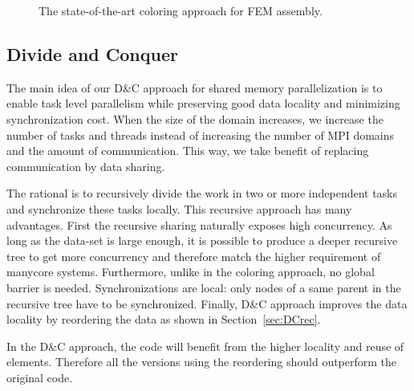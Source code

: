 \documentclass[10pt]{IOS-Book-Article}
\begin{document}
\begin{figure}[htp]
\caption{The state-of-the-art coloring approach for FEM assembly.}
\label{fig:colApp}
\end{figure}

\subsection{Divide and Conquer}
\label{sec:dc}

The main idea of our D\&C approach for shared memory parallelization is to enable task level parallelism while preserving good data locality and minimizing synchronization cost.
When the size of the domain increases, we increase the number of tasks and threads instead of increasing the number of MPI domains and the amount of communication.
This way, we take benefit of replacing communication by data sharing.

The rational is to recursively divide the work in two or more independent tasks and synchronize these tasks locally.
This recursive approach has many advantages.
First the recursive sharing naturally exposes high concurrency.
As long as the data-set is large enough, it is possible to produce a deeper recursive tree to get more concurrency and therefore match the higher requirement of manycore systems.
Furthermore, unlike in the coloring approach, no global barrier is needed.
Synchronizations are local: only nodes of a same parent in the recursive tree have to be synchronized.
Finally, D\&C approach improves the data locality by reordering the data as shown in Section~\ref{sec:DCrec}.

In the D\&C approach, the code will benefit from the higher locality and reuse of elements.
Therefore all the versions using the reordering should outperform the original code.
\end{document}
